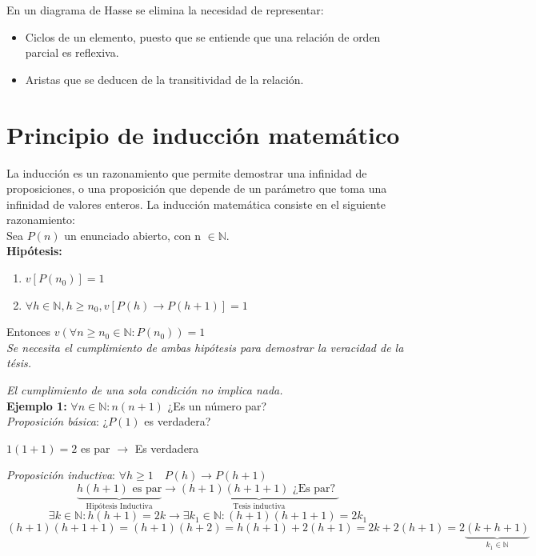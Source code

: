 En un diagrama de Hasse se elimina la necesidad de representar:
\begin{itemize}
	\item Ciclos de un elemento, puesto que se entiende que una relación de orden parcial es reflexiva.
	\item Aristas que se deducen de la transitividad de la relación.
\end{itemize}

\newpage
\section{Principio de inducción matemático}
La inducción es un razonamiento que permite demostrar una infinidad de proposiciones, o una proposición que depende de un parámetro que toma una infinidad de valores enteros. 
La inducción matemática consiste en el siguiente razonamiento:\\

Sea $P(n)$ un enunciado abierto, con n $\in \mathbb{N}$.\\

\textbf{Hipótesis:}
\begin{enumerate}
	\item $v[P(n_{0})] = 1 $
	\item $ \forall h \in \mathbb{N} , h \geqslant n_{0} , v[P(h) \rightarrow P(h+1)] = 1$
\end{enumerate}

Entonces $v(\forall n \geqslant n_{0} \in \mathbb{N} : P(n_{0})) = 1$\\

\emph{Se necesita el cumplimiento de ambas hipótesis para demostrar la veracidad de la tésis.}

\emph{El cumplimiento de una sola condición no implica nada.}\\

\textbf{Ejemplo 1:} 
$\forall n \in \mathbb{N}: n(n+1)$ ¿Es un número par?\\

\emph{Proposición básica}: ¿$P(1)$ es verdadera?
\begin{center}
	$1(1+1) = 2$ es par $\rightarrow$ Es verdadera
\end{center}

\emph{Proposición inductiva}: $\forall h \geq 1 \quad P(h) \rightarrow P(h+1)$
\begin{equation*}
	\underbrace{h(h+1) \text{ es par}}_{\text{Hipótesis Inductiva}} \rightarrow \underbrace{(h+1)(h+1+1) \text{ ¿Es par? }}_{\text{Tesis inductiva}}
\end{equation*}
\begin{equation*}
	\exists k \in \mathbb{N}: h(h+1) = 2k \rightarrow \exists k_{1} \in \mathbb{N}: (h+1)(h+1+1) = 2k_{1}
\end{equation*}
\begin{equation*}
	(h+1)(h+1+1) = (h+1)(h+2) = h(h+1) + 2(h+1) = 2k + 2 (h+1) = 2 \underbrace{(k+h+1)}_{k_{1} \in \mathbb{N}}
\end{equation*}

